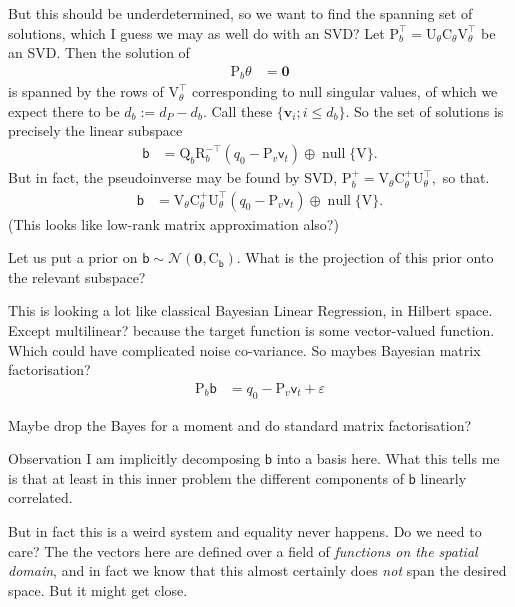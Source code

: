 \documentclass{article}
\newcommand{\vv}[1]{\boldsymbol{#1}}
\newcommand{\mm}[1]{\mathrm{#1}}
\newcommand{\rv}[1]{\mathsf{#1}}
\newcommand{\dist}[1]{\mathcal{#1}}
\newcommand{\lat}{\rv{b}}   %
\newcommand{\latst}{b}      %
\begin{document}
But this should be underdetermined, so we want to find the spanning set of solutions, which I guess we may as well do with an SVD?
Let \(\mm{P}_{\latst}^\top=\mm{U}_\theta\mm{C}_\theta\mm{V}_\theta^{\top}\) be an SVD.
Then the solution of
\begin{align}
    \mm{P}_{\latst}\theta &= \vv{0}
\end{align}
is spanned by the rows of \(\mm{V}_\theta^{\top}\) corresponding to null singular values, of which we expect there to be \(d_b:=d_P-d_{\latst}\). Call these \(\{\vv{v}_i;i\leq d_b\}\).
So the set of solutions is precisely the linear subspace
\begin{align}
    \lat &= \mm{Q}_{\latst}\mm{R}_{\latst}^{-\top}(q_0 - \mm{P}_{v}\rv{v}_{t}) \oplus \operatorname{null}\{\mm{V}\}.
\end{align}
But in fact, the pseudoinverse may be found by SVD, \(\mm{P}_{\latst}^{+}=\mm{V}_\theta\mm{C}_\theta^{+}\mm{U}_\theta^{\top},\) so that.
\begin{align}
    \lat &=\mm{V}_\theta\mm{C}_\theta^{+}\mm{U}_\theta^{\top}(q_0 - \mm{P}_{v}\rv{v}_{t}) \oplus \operatorname{null}\{\mm{V}\}.
\end{align}
(This looks like low-rank matrix approximation also?)

Let us put a prior on \(\lat\sim\dist{N}(\vv{0},\mm{C}_{\lat})\).
What is the projection of this prior onto the relevant subspace?

This is looking a lot like classical Bayesian Linear Regression, in Hilbert space.
Except multilinear? because the target function is some vector-valued function.
Which could have complicated noise co-variance. So maybes Bayesian matrix factorisation?
\begin{align}
    \mm{P}_{\latst}\lat &= q_0 - \mm{P}_{v}\rv{v}_{t} + \varepsilon
\end{align}

Maybe drop the Bayes for a moment and do standard matrix factorisation?

Observation I am implicitly decomposing \(\lat\) into a basis here.
What this tells me is that at least in this inner problem the different components of \(\lat\) linearly correlated.

But in fact this is a weird system and equality never happens. Do we need to care?
The the vectors here are defined over a field of \emph{functions on the spatial domain}, and in fact we know that this almost certainly does \emph{not} span the desired space. But it might get close.
\end{document}
